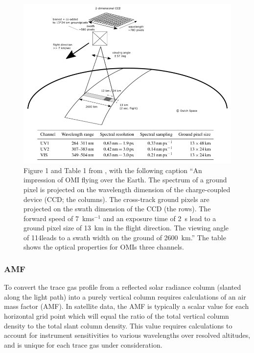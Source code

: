     \begin{figure}
      \includegraphics[width=\textwidth]{Figures/Shenkeveld_OMI_summary.png}
              \caption{ %
                Figure 1 and Table 1 from \cite{Schenkeveld2017}, with the following caption ``An impression of OMI flying over the Earth.
                The spectrum of a ground pixel is projected on the wavelength dimension of the charge-coupled device (CCD; the columns). 
                The cross-track ground pixels are projected on the swath dimension of the CCD (the rows).
                The forward speed of 7~kms$^{-1}$ and an exposure time of 2~s lead to a ground pixel size of 13~km in the flight direction.
                The viewing angle of 114\degr leads to a swath width on the ground of 2600~km.''
                The table shows the optical properties for OMIs three channels.}
      \label{LR:HCHO:Sat:fig_Shenkeveld_OMI_summary}
    \end{figure}
    
    \subsubsection{AMF}
    To convert the trace gas profile from a reflected solar radiance column (slanted along the light path) into a purely vertical column requires calculations of an air mass factor (AMF).
    In satellite data, the AMF is typically a scalar value for each horizontal grid point which will equal the ratio of the total vertical column density to the total slant column density.
    This value requires calculations to account for instrument sensitivities to various wavelengths over resolved altitudes, and is unique for each trace gas under consideration.
    
